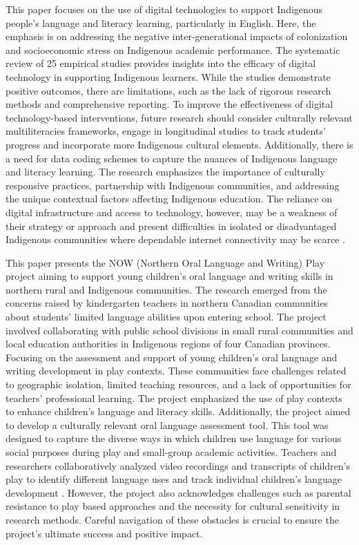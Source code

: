 \documentclass[a4paper,twoside]{article}
\begin{document}
This paper focuses on the use of digital technologies to support Indigenous people’s language and literacy learning, particularly in English. Here, the emphasis is on addressing the negative inter-generational impacts of colonization and socioeconomic stress on Indigenous academic performance. The systematic review of 25 empirical studies provides insights into the efficacy of digital technology in supporting Indigenous learners. While the studies demonstrate positive outcomes, there are limitations, such as the lack of rigorous research methods and comprehensive reporting. To improve the effectiveness
of digital technology-based interventions, future research should
consider culturally relevant multiliteracies frameworks, engage in longitudinal studies to track students’ progress and incorporate more Indigenous cultural elements. Additionally, there is a need for data coding schemes to capture the nuances of Indigenous language and literacy learning. The research emphasizes the importance of culturally responsive practices, partnership with Indigenous communities, and addressing the unique contextual factors affecting Indigenous education. The reliance on digital infrastructure and access to technology, however, may be a weakness of their strategy or approach and present difficulties in isolated or disadvantaged Indigenous communities where dependable internet connectivity may be scarce \cite{JiaLi21}.

This paper presents the NOW (Northern Oral Language and Writing) Play project aiming to support young
children’s oral language and writing skills in northern rural and Indigenous communities. The research emerged from the concerns raised by kindergarten teachers in northern Canadian communities about students’ limited language abilities upon entering school. The project involved collaborating with public school divisions in small rural communities and local education authorities in Indigenous regions of four Canadian provinces. Focusing on the assessment and support of young children’s oral language and writing development in play contexts. These communities face challenges related to geographic isolation, limited teaching resources, and a lack of opportunities for teachers’ professional learning. The project emphasized the use of play contexts to enhance children’s language and literacy skills. Additionally, the project aimed to develop a culturally relevant oral language assessment tool. This tool was designed to capture the diverse ways in which children use language for various social purposes during play and small-group academic
activities. Teachers and researchers collaboratively analyzed video
recordings and transcripts of children’s play to identify different language uses and track individual children’s language development \cite{Stagg16}. However, the project also acknowledges challenges such as parental resistance to play based approaches and the necessity for cultural sensitivity in research methods. Careful navigation of these obstacles is crucial to ensure the project’s ultimate success and positive impact.
\end{document}
